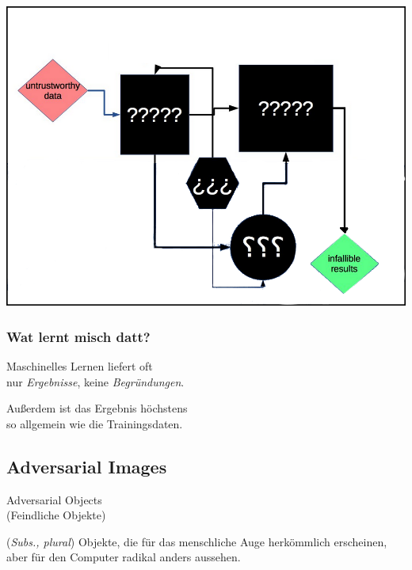 \documentclass[aspectratio=169,x11names]{beamer}
\begin{document}
\begin{frame}
\begin{center}
\includegraphics[height=0.65\textheight,keepaspectratio]{images/deep_neural_networks_4.png} 
\end{center}
\end{frame}

\begin{frame}
\frametitle{Wat lernt misch datt?}
\begin{center}
\color{red}
\large
Maschinelles Lernen liefert oft\\nur \emph{Ergebnisse}, keine \emph{Begründungen}.
\pause\bigskip

Außerdem ist das Ergebnis höchstens\\so allgemein wie die Trainingsdaten.
\end{center}
\end{frame}


\subsection{Adversarial Images}
\begin{frame}
\begin{center}
\huge
\glqq Adversarial Objects\grqq \\
\Large
(Feindliche Objekte)
\end{center}
\bigskip
\normalsize

(\textit{Subs., plural}) Objekte, die für das menschliche Auge herkömmlich erscheinen,
aber für den Computer radikal anders aussehen.
\end{frame}
\end{document}
